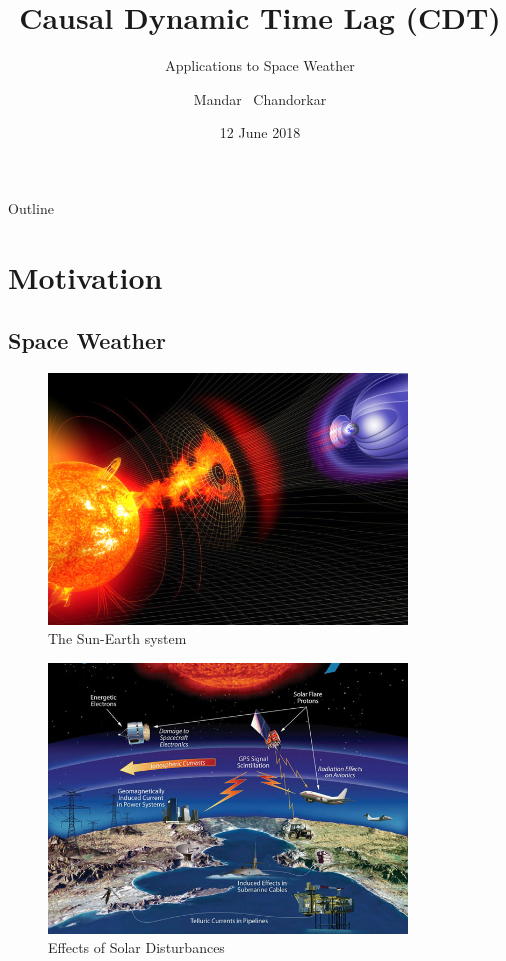\documentclass{beamer}
\title{Causal Dynamic Time Lag (CDT)}
\subtitle{Applications to Space Weather}
\author{Mandar ~Chandorkar}
\institute[CWI \& INRIA] %
{
  \inst{1}%
  Multiscale Dynamics\\
  CWI, Amsterdam
  \and
  \inst{2}%
  TAO Research Unit\\
  INRIA, CNRS, Saclay}
\date{12 June 2018}
\begin{document}
\begin{frame}
  \titlepage
\end{frame}

\begin{frame}{Outline}
  \tableofcontents
\end{frame}

\section{Motivation}

\subsection{Space Weather}

\begin{frame}
\begin{figure}[h]
        \includegraphics[width=0.85\textwidth]{space-weather.jpg}
        \caption{The Sun-Earth system}
        \label{fig:sun-earth}
\end{figure}
\end{frame}

\begin{frame}
\begin{figure}[h]
        \includegraphics[width=0.85\textwidth]{nasa-space-weather.jpg}
        \caption{Effects of Solar Disturbances}
        \label{fig:sun-earth-nasa}
\end{figure}
\end{frame}
\end{document}
